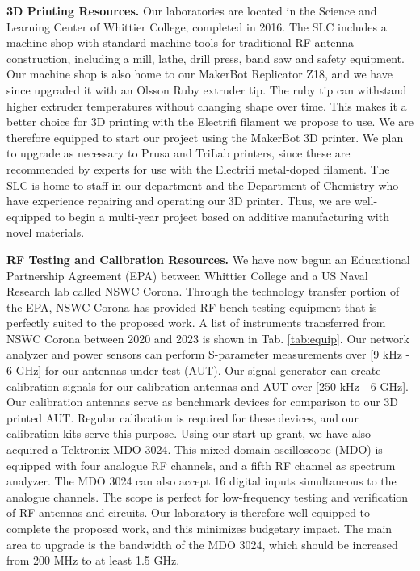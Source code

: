 \documentclass[../../main.tex]{subfiles}
\begin{document}
\textbf{3D Printing Resources.}  Our laboratories are located in the Science and Learning Center of Whittier College, completed in 2016.  The SLC includes a machine shop with standard machine tools for traditional RF antenna construction, including a mill, lathe, drill press, band saw and safety equipment.  Our machine shop is also home to our MakerBot Replicator Z18, and we have since upgraded it with an Olsson Ruby extruder tip.  The ruby tip can withstand higher extruder temperatures without changing shape over time.  This makes it a better choice for 3D printing with the Electrifi filament we propose to use.  We are therefore equipped to start our project using the MakerBot 3D printer.  We plan to upgrade as necessary to Prusa and TriLab printers, since these are recommended by experts for use with the Electrifi metal-doped filament.  The SLC is home to staff in our department and the Department of Chemistry who have experience repairing and operating our 3D printer.  Thus, we are well-equipped to begin a multi-year project based on additive manufacturing with novel materials. \\ \vspace{2.5mm}

\textbf{RF Testing and Calibration Resources.}  We have now begun an Educational Partnership Agreement (EPA) between Whittier College and a US Naval Research lab called NSWC Corona.  Through the technology transfer portion of the EPA, NSWC Corona has provided RF bench testing equipment that is perfectly suited to the proposed work.  A list of instruments transferred from NSWC Corona between 2020 and 2023 is shown in Tab. \ref{tab:equip}.  Our network analyzer and power sensors can perform S-parameter measurements over [9 kHz - 6 GHz] for our antennas under test (AUT).  Our signal generator can create calibration signals for our calibration antennas and AUT over [250 kHz - 6 GHz].  Our calibration antennas serve as benchmark devices for comparison to our 3D printed AUT.  Regular calibration is required for these devices, and our calibration kits serve this purpose.  Using our start-up grant, we have also acquired a Tektronix MDO 3024.  This mixed domain oscilloscope (MDO) is equipped with four analogue RF channels, and a fifth RF channel as spectrum analyzer.  The MDO 3024 can also accept 16 digital inputs simultaneous to the analogue channels.  The scope is perfect for low-frequency testing and verification of RF antennas and circuits.  Our laboratory is therefore well-equipped to complete the proposed work, and this minimizes budgetary impact.  The main area to upgrade is the bandwidth of the MDO 3024, which should be increased from 200 MHz to at least 1.5 GHz.  \\ \vspace{2.5mm}
\end{document}
